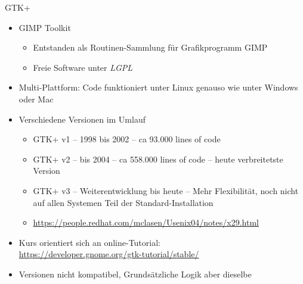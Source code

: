 \begin{frame}{GTK+}
%
\begin{itemize}
\item GIMP Toolkit
	\begin{itemize}
	\item Entstanden als Routinen-Sammlung für Grafikprogramm GIMP
	\item Freie Software unter \emph{LGPL}
	\end{itemize}
\item Multi-Plattform: Code funktioniert unter Linux genauso wie unter Windows oder Mac
\item Verschiedene Versionen im Umlauf
	\begin{itemize}
	\item GTK+ v1 -- 1998 bis 2002 -- ca  93.000 lines of code
	\item GTK+ v2 -- bis 2004 -- ca 558.000 lines of code -- heute verbreitetste Version
	\item GTK+ v3 -- Weiterentwicklung bis heute -- 
		Mehr Flexibilität, noch nicht auf allen Systemen Teil der Standard-Installation
	\item \url{https://people.redhat.com/mclasen/Usenix04/notes/x29.html}
	\end{itemize}
\item Kurs orientiert sich an online-Tutorial:\\
	\url{https://developer.gnome.org/gtk-tutorial/stable/}
\item Versionen nicht kompatibel, Grundsätzliche Logik aber dieselbe
\end{itemize}

%
\end{frame}


